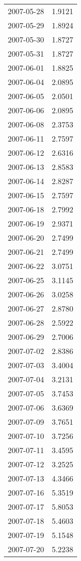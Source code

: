 \begin{tabular}{lr}
2007-05-28 &      1.9121 \\
2007-05-29 &      1.8924 \\
2007-05-30 &      1.8727 \\
2007-05-31 &      1.8727 \\
2007-06-01 &      1.8825 \\
2007-06-04 &      2.0895 \\
2007-06-05 &      2.0501 \\
2007-06-06 &      2.0895 \\
2007-06-08 &      2.3753 \\
2007-06-11 &      2.7597 \\
2007-06-12 &      2.6316 \\
2007-06-13 &      2.8583 \\
2007-06-14 &      2.8287 \\
2007-06-15 &      2.7597 \\
2007-06-18 &      2.7992 \\
2007-06-19 &      2.9371 \\
2007-06-20 &      2.7499 \\
2007-06-21 &      2.7499 \\
2007-06-22 &      3.0751 \\
2007-06-25 &      3.1145 \\
2007-06-26 &      3.0258 \\
2007-06-27 &      2.8780 \\
2007-06-28 &      2.5922 \\
2007-06-29 &      2.7006 \\
2007-07-02 &      2.8386 \\
2007-07-03 &      3.4004 \\
2007-07-04 &      3.2131 \\
2007-07-05 &      3.7453 \\
2007-07-06 &      3.6369 \\
2007-07-09 &      3.7651 \\
2007-07-10 &      3.7256 \\
2007-07-11 &      3.4595 \\
2007-07-12 &      3.2525 \\
2007-07-13 &      4.3466 \\
2007-07-16 &      5.3519 \\
2007-07-17 &      5.8053 \\
2007-07-18 &      5.4603 \\
2007-07-19 &      5.1548 \\
2007-07-20 &      5.2238 \\

\end{tabular}
